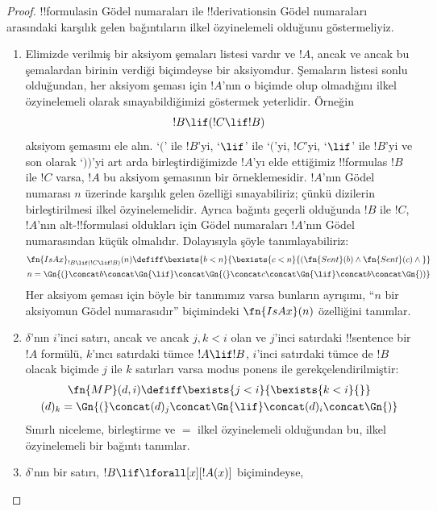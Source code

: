 \documentclass[../../../include/open-logic-section]{subfiles}
\begin{document}
\begin{proof}
!!{formula}s{}in Gödel numaraları ile !!{derivation}s{}in Gödel numaraları
arasındaki karşılık gelen bağıntıların ilkel özyinelemeli olduğunu
göstermeliyiz.
\begin{enumerate}
\item Elimizde verilmiş bir aksiyom şemaları listesi vardır ve $!A$, ancak ve
  ancak bu şemalardan birinin verdiği biçimdeyse bir aksiyomdur. Şemaların
  listesi sonlu olduğundan, her aksiyom şeması için $!A$'nın o biçimde olup
  olmadığını ilkel özyinelemeli olarak sınayabildiğimizi göstermek yeterlidir.
  Örneğin
  \[
  !B \lif (!C \lif !B)
  \]
  aksiyom şemasını ele alın. `$($' ile $!B$'yi, `$\lif$' ile `$($'yi,
  $!C$'yi, `$\lif$' ile $!B$'yi ve son olarak `$))$'yi art arda
  birleştirdiğimizde $!A$'yı elde ettiğimiz !!{formula}s $!B$ ile $!C$ varsa,
  $!A$ bu aksiyom şemasının bir örneklemesidir. $!A$'nın Gödel numarası $n$
  üzerinde karşılık gelen özelliği sınayabiliriz; çünkü dizilerin
  birleştirilmesi ilkel özyinelemelidir. Ayrıca bağıntı geçerli olduğunda
  $!B$ ile $!C$, $!A$'nın alt-!!{formula}s{}i oldukları için Gödel numaraları
  $!A$'nın Gödel numarasından küçük olmalıdır. Dolayısıyla şöyle
  tanımlayabiliriz:
  \begin{multline*}
  \fn{IsAx}_{!B \lif (!C \lif !B)}(n) \defiff \bexists{b< n}{
    \bexists{c < n}{(\fn{Sent}(b) \land \fn{Sent}(c) \land {}}}\\ n =
  \Gn{(} \concat b \concat \Gn{\lif} \concat \Gn{(} \concat c \concat
  \Gn{\lif} \concat b \concat \Gn{))}
  \end{multline*}
  Her aksiyom şeması için böyle bir tanımımız varsa bunların ayrışımı,
  ``$n$ bir aksiyomun Gödel numarasıdır'' biçimindeki $\fn{IsAx}(n)$
  özelliğini tanımlar.
\item $\delta$'nın $i$'inci satırı, ancak ve ancak $j,k<i$ olan ve $j$'inci
  satırdaki !!{sentence} bir $!A$ formülü, $k$'ıncı satırdaki tümce
  $!A \lif !B$, $i$'inci satırdaki tümce de $!B$ olacak biçimde $j$ ile $k$
  satırları varsa modus ponens ile gerekçelendirilmiştir:
  \begin{multline*}
    \fn{MP}(d, i) \defiff \bexists{j < i}{\bexists{k < i}{}}\\
    (d)_k = \Gn{(} \concat (d)_j
      \concat \Gn{\lif} \concat (d)_i \concat \Gn{)}
  \end{multline*}
  Sınırlı niceleme, birleştirme ve $=$ ilkel özyinelemeli olduğundan bu, ilkel
  özyinelemeli bir bağıntı tanımlar.
\item $\delta$'nın bir satırı, $!B \lif \lforall[x][!A(x)]$ biçimindeyse,

\end{enumerate}
\end{proof}
\end{document}
